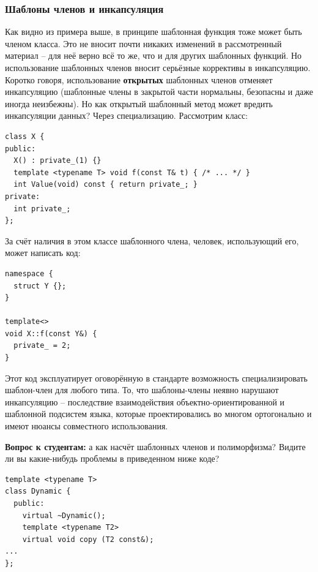 \documentclass[a4paper,12pt,oneside]{article}
\newif\ifanswers
\begin{document}
\subsubsection{Шаблоны членов и инкапсуляция}\label{TemplMembersEncapsulation}

Как видно из примера выше, в принципе шаблонная функция тоже может быть членом класса. Это не вносит почти никаких изменений в рассмотренный материал -- для неё верно всё то же, что и для других шаблонных функций. Но использование шаблонных членов вносит серьёзные коррективы в инкапсуляцию. Коротко говоря, использование \textbf{открытых} шаблонных членов отменяет инкапсуляцию (шаблонные члены в закрытой части нормальны, безопасны и даже иногда неизбежны). Но как открытый шаблонный метод может вредить инкапсуляции данных? Через специализацию. Рассмотрим класс:

\begin{lstlisting}
class X {
public:
  X() : private_(1) {}
  template <typename T> void f(const T& t) { /* ... */ }
  int Value(void) const { return private_; }
private:
  int private_;  
};
\end{lstlisting}

За счёт наличия в этом классе шаблонного члена, человек, использующий его, может написать код:

\begin{lstlisting}
namespace {
  struct Y {};
}

template<>
void X::f(const Y&) {
  private_ = 2;
}
\end{lstlisting}

Этот код эксплуатирует оговорённую в стандарте возможность специализировать шаблон-член для любого типа. То, что шаблоны-члены неявно нарушают инкапсуляцию -- последствие взаимодействия объектно-ориентированной и шаблонной подсистем языка, которые проектировались во многом ортогонально и имеют нюансы совместного использования.

\textbf{Вопрос к студентам:} а как насчёт шаблонных членов и полиморфизма? Видите ли вы какие-нибудь проблемы в приведенном ниже коде?

\begin{lstlisting}
template <typename T> 
class Dynamic { 
  public: 
    virtual ~Dynamic();
    template <typename T2> 
    virtual void copy (T2 const&); 
...
};
\end{lstlisting}

\ifanswers
Правильный ответ: да, проблемы есть. Обычный механизм виртуальных функций полагается на виртуальные таблицы фиксированного размера, однако количество актуальных экземпляров шаблонного метода может быть любым. Поэтому такие трюки в языке запрещены.
\fi
\end{document}
